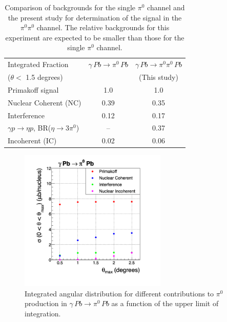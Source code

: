 \begin{table}[t]
\caption{Comparison of backgrounds for the single $\pi^0$ channel and the present study for 
determination of the signal in the $\pi^0\pi^0$ channel. The relative backgrounds for this experiment
are expected to be smaller than those for the single $\pi^0$ channel.
\label{tab:Primex_sigmas}
}
\begin{center}
\begin{tabular}{|l|c|c|}
\hline
\hline 
 Integrated Fraction & $\gamma\,Pb\to \pi^0\, Pb$  & $\gamma\,Pb\to \pi^0\pi^0\, Pb$ \\  
  ($\theta <$ 1.5 degrees)                    &       & (This study) \\  \hline
  Primakoff signal  &   1.0   & 1.0   \\ \hline 
  Nuclear Coherent (NC)  & 0.39  &   0.35   \\ \hline 
  Interference  & 0.12  &  0.17   \\ \hline 
  $\gamma p \rightarrow \eta p$, BR($\eta \rightarrow 3\pi^0$)  &   -- & 0.37   \\ \hline 
  Incoherent (IC)  &   0.02  & 0.06  \\
  \hline   
  \hline
\end{tabular}
\end{center}
\end{table}


\begin{figure}[tbp]
\begin{center}
\includegraphics[width=7cm,angle=0]{figures/Primex_sigmas_c1.png}
\end{center}
\caption{Integrated angular distribution for different contributions to $\pi^0$ production in $\gamma\,Pb\rightarrow\pi^0\,Pb$ as a function of the upper limit of integration.}
\label{fig:Primex_sigmas_c1}
\end{figure}


